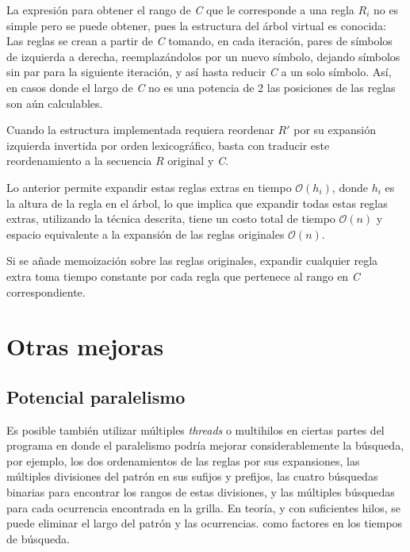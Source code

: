 La expresión para obtener el rango de \textit{C} que le corresponde a una regla $R_i$ no es simple pero se puede obtener, pues la estructura del árbol virtual es conocida: Las reglas se crean a partir de \textit{C} tomando, en cada iteración, pares de símbolos de izquierda a derecha, reemplazándolos por un nuevo símbolo, dejando símbolos sin par para la siguiente iteración, y así hasta reducir \textit{C} a un solo símbolo. Así, en casos donde el largo de \textit{C} no es una potencia de 2 las posiciones de las reglas son aún calculables.

Cuando la estructura implementada requiera reordenar $R'$ por su expansión izquierda invertida por orden lexicográfico, basta con traducir este reordenamiento a la secuencia $R$ original y \textit{C}.

Lo anterior permite expandir estas reglas extras en tiempo $\mathcal{O}(h_i)$, donde $h_i$ es la altura de la regla en el árbol, lo que implica que expandir todas estas reglas extras, utilizando la técnica descrita, tiene un costo total de tiempo $\mathcal{O}(n)$ y espacio equivalente a la expansión de las reglas originales $\mathcal{O}(n)$. 

Si se añade memoización sobre las reglas originales, expandir cualquier regla extra toma tiempo constante por cada regla que pertenece al rango en \textit{C} correspondiente.

\section{Otras mejoras}

\subsection{Potencial paralelismo}

Es posible también utilizar múltiples \textit{threads} o multihilos en ciertas partes del programa en donde el paralelismo podría mejorar considerablemente la búsqueda, por ejemplo, los dos ordenamientos de las reglas por sus expansiones, las múltiples divisiones del patrón en sus sufijos y prefijos, las cuatro búsquedas binarias para encontrar los rangos de estas divisiones, y las múltiples búsquedas para cada ocurrencia encontrada en la grilla. En teoría, y con suficientes hilos, se puede eliminar el largo del patrón y las ocurrencias. como factores en los tiempos de búsqueda. 
